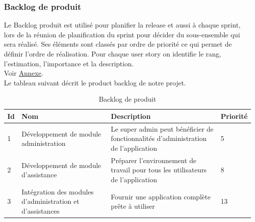 \documentclass{article}
\begin{document}
\subsubsection{Backlog de produit}
Le Backlog produit est utilisé pour planifier la release et aussi à chaque sprint, lors de la réunion de planification du sprint pour décider du sous-ensemble qui sera réalisé. Ses éléments sont classés par ordre de priorité ce qui permet de définir l’ordre de réalisation.
Pour chaque user story on identifie le rang, l’estimation, l'importance et la description.\\
Voir \hyperref[sec:hello2]{Annexe}.\\
Le tableau suivant décrit le product backlog de notre projet.
\begin{table}[H]
\centering
\label{tab:tab2} 
 \begin{tabularx}{\textwidth}{|X|X|X|X|}
\hline
\bfseries{ Id} &\bfseries{ Nom} &\bfseries{ Description} &\bfseries{ Priorité} \\ \hline
1& Développement de module administration &Le super admin peut bénéficier de fonctionnalités d'administration de l'application & 5\\
\hline
2& Développement de module d'assistance &Préparer l'environnement de travail pour tous les utilisateurs de l'application & 8\\
\hline 
3&Intégration des modules d'administration et d'assistances &Fournir une application complète prête à utiliser & 13\\
\hline
\end{tabularx}
\caption[tableau2 : Backlog de produit]{Backlog de produit}
\end{table}
\end{document}
